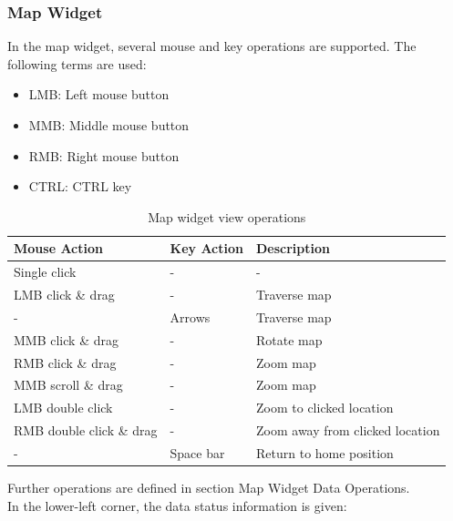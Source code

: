 \subsubsection{Map Widget}
\label{sec:osgview_map}

In the map widget, several mouse and key operations are supported. The following terms are used:

\begin{itemize}
 \item LMB: Left mouse button
 \item MMB: Middle mouse button
 \item RMB: Right mouse button
 \item CTRL: CTRL key
\end{itemize}

\begin{table}[H]
  \center
  \begin{tabular}{ | l | l | l |}
    \hline
    \textbf{Mouse Action} & \textbf{Key Action} &  \textbf{Description} \\ \hline
    Single click & - & - \\ \hline
    LMB click \& drag & - & Traverse map \\ \hline
    - & Arrows & Traverse map \\ \hline
    MMB click \& drag & - & Rotate map \\ \hline
    RMB click \& drag & - & Zoom map \\ \hline
    MMB scroll \& drag & - & Zoom map \\ \hline
    LMB double click & - & Zoom to clicked location \\ \hline
    RMB double click \& drag & - & Zoom away from clicked location \\ \hline
    - & Space bar & Return to home position \\ \hline
  \end{tabular}
  \caption{Map widget view operations}
\end{table}

Further operations are defined in section Map Widget Data Operations. \\

In the lower-left corner, the data status information is given:

